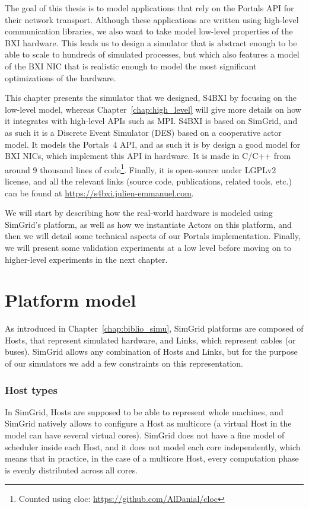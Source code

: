 The goal of this thesis is to model applications that rely on the Portals API
for their network transport. Although these applications are written using
high-level communication libraries, we also want to take model low-level
properties of the BXI hardware. This leads us to design a simulator that is
abstract enough to be able to scale to hundreds of simulated processes, but
which also features a model of the BXI NIC that is realistic enough to model the
most significant optimizations of the hardware.

This chapter presents the simulator that we designed, S4BXI by focusing on the
low-level model, whereas Chapter~\ref{chap:high_level} will give more details on
how it integrates with high-level APIs such as MPI. S4BXI is based on SimGrid,
and as such it is a Discrete Event Simulator (DES) based on a cooperative actor
model. It models the Portals~4 API, and as such it is by design a good model for
BXI NICs, which implement this API in hardware. It is made in C/C++ from around
9 thousand lines of code\footnote{Counted using cloc:
\url{https://github.com/AlDanial/cloc}}. Finally, it is open-source under LGPLv2
license, and all the relevant links (source code, publications, related tools,
etc.) can be found at \url{https://s4bxi.julien-emmanuel.com}.

We will start by describing how the real-world hardware is
modeled using SimGrid's platform, as well as how we instantiate Actors on this
platform, and then we will detail some technical aspects of our Portals
implementation. Finally, we will present some validation experiments at a low
level before moving on to higher-level experiments in the next chapter.

\section{Platform model}

As introduced in Chapter~\ref{chap:biblio_simu}, SimGrid platforms are composed
of Hosts, that represent simulated hardware, and Links, which represent cables
(or buses). SimGrid allows any combination of Hosts and Links, but for the
purpose of our simulators we add a few constraints on this representation.

\subsubsection{Host types} 

In SimGrid, Hosts are supposed to be able to represent whole machines, and
SimGrid natively allows to configure a Host as multicore (a virtual Host in the
model can have several virtual cores). SimGrid does not have a fine model of
scheduler inside each Host, and it does not model each core independently, which
means that in practice, in the case of a multicore Host, every computation phase
is evenly distributed across all cores.


